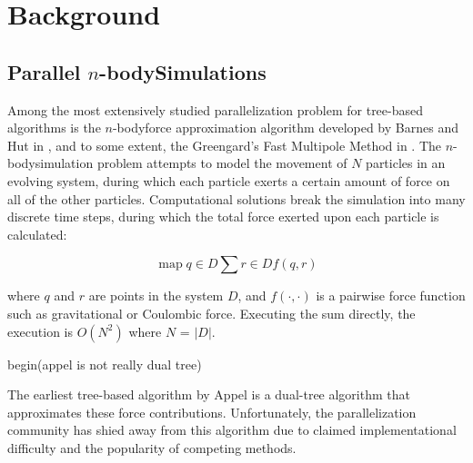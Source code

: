 \documentclass[times, 10pt,twocolumn]{article}
\DeclareMathOperator*{\map}{map}
\newcommand{\nbody}{$n$-body}
\begin{document}
%
%
%
%
%
%
%
%

\section{Background}

\subsection{Parallel \nbody Simulations}

Among the most extensively studied parallelization problem for tree-based algorithms is the \nbody force approximation algorithm developed by Barnes and Hut in \cite{barneshut}, and to some extent, the Greengard's Fast Multipole Method in \cite{fmm}.
The \nbody simulation problem attempts to model the movement of $N$ particles in an evolving system, during which each particle exerts a certain amount of force on all of the other particles.
Computational solutions break the simulation into many discrete time steps, during which the total force exerted upon each particle is calculated:

 $$\map{q \in D} \sum{r \in D} f(q, r)$$

\noindent where $q$ and $r$ are points in the system $D$, and $f(\cdot, \cdot)$ is a pairwise force function such as gravitational or Coulombic force.
Executing the sum directly, the execution is $O(N^2)$ where $N$ = $|D|$.

begin(appel is not really dual tree)

The earliest tree-based algorithm by Appel \cite{appel} is a dual-tree algorithm that approximates these force contributions.
Unfortunately, the parallelization community has shied away from this algorithm due to claimed implementational difficulty and the popularity of competing methods.
\end{document}
